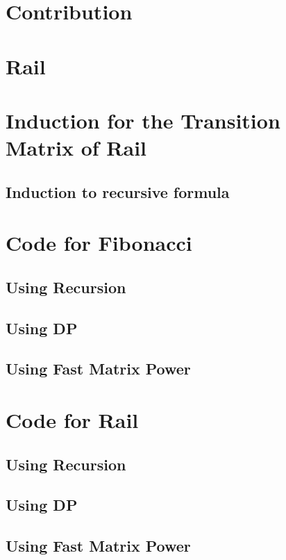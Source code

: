 \section{Contribution}

\section{Rail}
\label{rail}


\section{Induction for the Transition Matrix of Rail}
\label{induction for Rail}

\subsection{Induction to recursive formula} 

\section{Code for Fibonacci}
\label{Fibonacci Code}
\subsection{Using Recursion}


\subsection{Using DP}


\subsection{Using Fast Matrix Power}


\section{Code for Rail}
\label{Rail Code}
\subsection{Using Recursion}

\subsection{Using DP}

\subsection{Using Fast Matrix Power}
